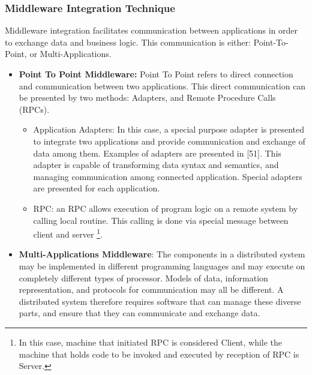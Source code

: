 \documentclass[12pt,a4paper,final,twoside,onecolumn,titlepage]{book}
\begin{document}
\subsubsection{Middleware Integration Technique}
Middleware integration facilitates communication between applications in order to exchange data and business logic. This communication is either: Point-To-Point, or Multi-Applications.
\begin{itemize}
\item \textbf{Point To Point Middleware:} Point To Point refers to direct connection and communication between two applications. This direct communication can be presented by two methods: Adapters, and Remote Procedure Calls (\gls{RPC}s).
\begin{itemize}
\item Application Adapters: In this case, a special purpose adapter is presented to integrate two applications and provide communication and exchange of data among them. Examples of adapters are presented in [51]. This adapter is capable of transforming data syntax and semantics, and managing communication among connected application. Special adapters are presented for each application.
\item \gls{RPC}: an \gls{RPC} allows execution of program logic on a remote system by calling local routine. This calling is done via special message between client and server \footnote{In this case, machine that initiated \gls{RPC} is considered Client, while the machine that holds code to be invoked and executed by reception of \gls{RPC} is Server.}.
\end{itemize}
\item \textbf{Multi-Applications Middleware}: The components in a distributed system may be implemented in different programming languages and may execute on completely different types of processor. Models of data, information representation, and protocols for communication may all be different. A distributed system therefore requires software that can manage these diverse parts, and ensure that they can communicate and exchange data.

\end{itemize}
\end{document}
